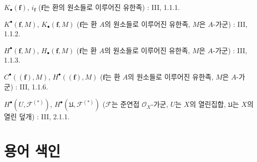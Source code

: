 \begin{flushleft}
$K_\bullet(\mathbf f)$, $i_{\mathbf f}$ ($\mathbf f$는 환의 원소들로
이루어진 유한족) : III, 1.1.1.

$K^\bullet(\mathbf f,M)$, $K_\bullet(\mathbf f,M)$ ($\mathbf f$는 환
$A$의 원소들로 이루어진 유한족, $M$은 $A$-가군) : III, 1.1.2.

$H^\bullet(\mathbf f,M)$, $H_\bullet(\mathbf f,M)$ ($\mathbf f$는 환
$A$의 원소들로 이루어진 유한족, $M$은 $A$-가군) : III, 1.1.3.

$C^\bullet((\mathbf f),M)$, $H^\bullet((\mathbf f),M)$ ($\mathbf f$는
환 $A$의 원소들로 이루어진 유한족, $M$은 $A$-가군) : III, 1.1.6.

$H^\bullet(U,\mathcal F^{(*)})$,
$H^\bullet(\mathfrak U,\mathcal F^{(*)})$ ($\mathcal F$는 준연접
$\mathcal O_X$-가군, $U$는 $X$의 열린집합, $\mathfrak U$는
$X$의 열린 덮개) : III, 2.1.1.
\end{flushleft}

\clearpage
{}

\section*{용어 색인}

